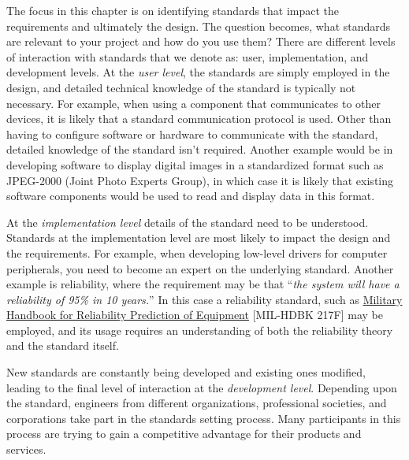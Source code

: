 The focus in this chapter is on identifying standards that impact the
requirements and ultimately the design. The question becomes, what
standards are relevant to your project and how do you use them? There
are different levels of interaction with standards that we denote as:
user, implementation, and development levels. At the \emph{user level},
the standards are simply employed in the design, and detailed technical
knowledge of the standard is typically not necessary. For example, when
using a component that communicates to other devices, it is likely that
a standard communication protocol is used. Other than having to
configure software or hardware to communicate with the standard,
detailed knowledge of the standard isn't required. Another example would
be in developing software to display digital images in a standardized
format such as JPEG-2000 (Joint Photo Experts Group), in which case it
is likely that existing software components would be used to read and
display data in this format.

At the \emph{implementation level} details of the standard need to be
understood. Standards at the implementation level are most likely to
impact the design and the requirements. For example, when developing
low-level drivers for computer peripherals, you need to become an expert
on the underlying standard. Another example is reliability, where the
requirement may be that ``\emph{the system will have a reliability of
95\% in 10 years.}'' In this case a reliability standard, such as
\ul{Military Handbook for Reliability Prediction of Equipment}
{[}MIL-HDBK 217F{]} may be employed, and its usage requires an
understanding of both the reliability theory and the standard itself.

New standards are constantly being developed and existing ones modified,
leading to the final level of interaction at the \emph{development
level}. Depending upon the standard, engineers from different
organizations, professional societies, and corporations take part in the
standards setting process. Many participants in this process are trying
to gain a competitive advantage for their products and services.

